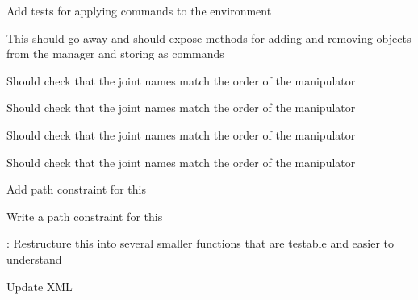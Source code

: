 
\begin{DoxyRefList}
\item[Member \mbox{\hyperlink{tesseract__environment__unit_8cpp_a7efd38cb7d246fd917d0181cc944ec94}{run\+Apply\+Commands\+Test}} ()]\label{todo__todo000002}%
%
Add tests for applying commands to the environment  
\item[Member \mbox{\hyperlink{classtesseract__environment_1_1Environment_a7f10ded105cbd32151631123466f8fbd}{tesseract\+\_\+environment\+::Environment\+::get\+Manipulator\+Manager}} ()]\label{todo__todo000001}%
%
This should go away and should expose methods for adding and removing objects from the manager and storing as commands  
\item[Member \mbox{\hyperlink{namespacetesseract__planning_a5479a76ec33cda8924d0e54d336e5ccc}{tesseract\+\_\+planning\+::Default\+Descartes\+Problem\+Generator}} (const std\+::string \&name, const \mbox{\hyperlink{structtesseract__planning_1_1PlannerRequest}{Planner\+Request}} \&request, const Descartes\+Plan\+Profile\+Map$<$ Float\+Type $>$ \&plan\+\_\+profiles)]\label{todo__todo000007}%
%
Should check that the joint names match the order of the manipulator 

\label{todo__todo000008}%
%
Should check that the joint names match the order of the manipulator  
\item[Member \mbox{\hyperlink{namespacetesseract__planning_aad1ed7198d10eba864130666e92d9b1f}{tesseract\+\_\+planning\+::Default\+Trajopt\+Ifopt\+Problem\+Generator}} (const std\+::string \&name, const \mbox{\hyperlink{structtesseract__planning_1_1PlannerRequest}{Planner\+Request}} \&request, const Traj\+Opt\+Ifopt\+Plan\+Profile\+Map \&plan\+\_\+profiles, const Traj\+Opt\+Ifopt\+Composite\+Profile\+Map \&composite\+\_\+profiles)]\label{todo__todo000043}%
%
Should check that the joint names match the order of the manipulator 

\label{todo__todo000042}%
%
Should check that the joint names match the order of the manipulator 

\label{todo__todo000041}%
%
Add path constraint for this 

\label{todo__todo000040}%
%
Write a path constraint for this 

\label{todo__todo000039}%
%
\+: Restructure this into several smaller functions that are testable and easier to understand  
\item[Member \mbox{\hyperlink{classtesseract__planning_1_1DescartesDefaultPlanProfile_a8bbf9dd170dfc5da44f4117d74ca7a6a}{tesseract\+\_\+planning\+::Descartes\+Default\+Plan\+Profile$<$ Float\+Type $>$\+::Descartes\+Default\+Plan\+Profile}} (const tinyxml2\+::\+XMLElement \&xml\+\_\+element)]\label{todo__todo000003}%
%
Update XML 


\end{DoxyRefList}
